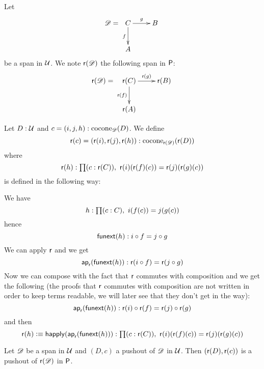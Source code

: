 \begin{defn}
  Let
  \[\Ddiag=\xymatrix{C \ar^g[r] \ar_f[d] & B \\ A & }\]
  be a span in $\type$. We note $\reflect(\Ddiag)$ the following
  span in $\P$:
  \[\reflect(\Ddiag)=\xymatrix{\reflect(C) \ar^{\reflect(g)}[r]
    \ar_{\reflect(f)}[d] & \reflect(B) \\ \reflect(A) & }\]
\end{defn}

\begin{defn}
  Let $D:\type$ and $c=(i,j,h):\cocone{\Ddiag}{D}$.
  We define
  \[\reflect(c)=(\reflect(i),\reflect(j),\reflect(h)):
  \cocone{\reflect(\Ddiag)}{\reflect(D)}\]
  where
  \[\reflect(h):\prd{c:\reflect(C)}\reflect(i)(\reflect(f)(c))=\reflect(j)(\reflect(g)(c))\]
  is defined in the following way:

  We have \[h:\prd{c:C}i(f(c))=j(g(c))\]
  hence
  \[\funext(h):i\circ{}f=j\circ{}g\]
  We can apply $\reflect$ and we get
  \[\mapfunc{\reflect}(\funext(h)):\reflect(i\circ{}f)=\reflect(j\circ{}g)\]
  Now we can compose with the fact that $\reflect$ commutes with composition and
  we get the following (the proofs that $\reflect$ commutes with composition are
  not written in order to keep terms readable, we will later see that they don't
  get in the way):
  \[\mapfunc{\reflect}(\funext(h)):
  \reflect(i)\circ\reflect(f)=\reflect(j)\circ\reflect(g)\]
  and then
  \[\reflect(h)\defeq\happly(\mapfunc{\reflect}(\funext(h))):
  \prd{c:\reflect(C)}\reflect(i)(\reflect(f)(c))=\reflect(j)(\reflect(g)(c))\]
\end{defn}

\begin{lem}
  \label{reflectcommutespushout}
  Let $\Ddiag$ be a span in $\type$ and $(D,c)$ a pushout of $\Ddiag$
  in $\type$. Then $(\reflect(D),\reflect(c))$ is a pushout of
  $\reflect(\Ddiag)$ in $\P$.
\end{lem}

